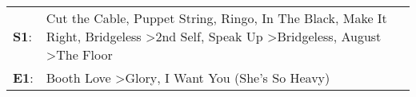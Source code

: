 \begin{supertabular}{p{0.03\textwidth}p{0.92\textwidth}}
 \textbf{S1}:  &  Cut the Cable\textsuperscript{}, \enspace Puppet String\textsuperscript{}, \enspace Ringo\textsuperscript{}, \enspace In The Black\textsuperscript{}, \enspace Make It Right\textsuperscript{}, \enspace Bridgeless\textsuperscript{} \textgreater \enspace 2nd Self\textsuperscript{}, \enspace Speak Up\textsuperscript{} \textgreater \enspace Bridgeless\textsuperscript{}, \enspace August\textsuperscript{} \textgreater \enspace The Floor\textsuperscript{}  \enspace  \\
 \textbf{E1}:  &                                                                                                                                                                                                                                                                                                                                   Booth Love\textsuperscript{} \textgreater \enspace Glory\textsuperscript{}, \enspace I Want You (She's So Heavy)\textsuperscript{}  \enspace  \\
\end{supertabular}
